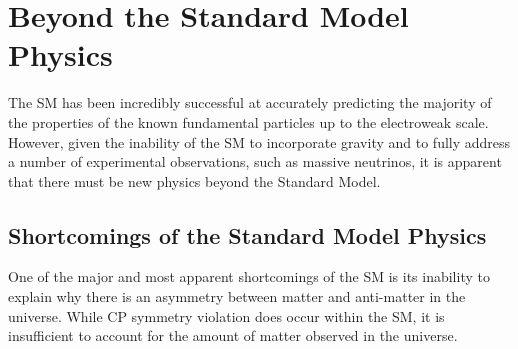 %
%
%


%   

\section{Beyond the Standard Model Physics}\label{sec:bsm}
The SM has been incredibly successful at accurately predicting the majority of the properties of the known fundamental particles up to the electroweak scale.
However, given the inability of the SM to incorporate gravity and to fully address a number of experimental observations, such as massive neutrinos, it is apparent that there must be new physics beyond the Standard Model.

\subsection{Shortcomings of the Standard Model Physics}\label{subsec:shortcomings}
One of the major and most apparent shortcomings of the SM is its inability to explain why there is an asymmetry between matter and anti-matter in the universe.
While CP symmetry violation does occur within the SM, it is insufficient to account for the amount of matter observed in the universe.

